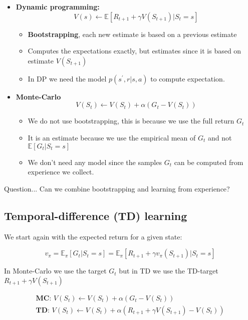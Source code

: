 \begin{itemize}
	\item \textbf{Dynamic programming: }
		\begin{equation}
			V(s) \leftarrow \mathbb{E}[R_{t+1} + \gamma V(S_{t+1}) |S_t = s]
		\end{equation}
		\begin{itemize}
			\item \textbf{Bootstrapping}, each new estimate is based on a previous estimate
			\item Computes the expectations exactly, but estimates since it is based on estimate $V(S_{t+1})$ 
			\item In DP we need the model $p(s^{\prime},r|s,a)$ to compute expectation. 
		\end{itemize}
	\item \textbf{Monte-Carlo}
		\begin{equation}
			V(S_t) \leftarrow V(S_t) + \alpha(G_t - V(S_t))
		\end{equation}
		\begin{itemize}
			\item We do not use bootstrapping, this is because we use the full return $G_t$
			\item It is an estimate because we use the empirical mean of $G_t$ and not $\mathbb{E}[G_t |S_t = s	]$
			\item We don't need any model since the samples $G_t$ can be computed from experience we collect.
		\end{itemize}
\end{itemize}

Question... Can we combine bootstrapping and learning from experience?

\subsection{Temporal-difference (TD) learning}

We start again with the expected return for a given state:

	\begin{equation}
		v_\pi = \mathbb{E}_\pi [G_t | S_t = s] = \mathbb{E}_\pi[R_{t+1} + \gamma v_\pi(S_{t+1})|S_t = s]
	\end{equation}

In Monte-Carlo we use the target $G_t$ but in TD we use the TD-target $R_{t+1} + \gamma V(S_{t+1})$

	\begin{equation}
	\begin{aligned}
		\textbf{MC: } V(S_t) \leftarrow V(S_t) + \alpha (G_t - V(S_t)) \\
		\textbf{TD: } V(S_t) \leftarrow V(S_t) + \alpha (R_{t+1} + \gamma V(S_{t+1}) - V(S_t))
	\end{aligned}
	\end{equation}

